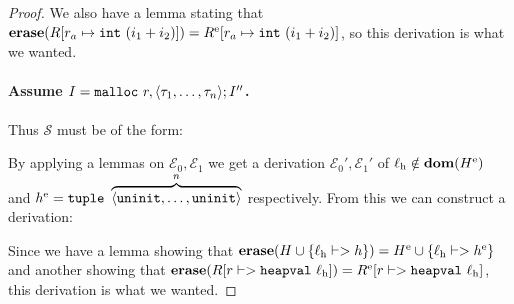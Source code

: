 \begin{proof}
  We also have a lemma stating that
  $\erase(\high R[r_a \mapsto \mathtt{int}\ (i_1 + i_2)]) = \high R^{\mathrm{e}}[r_a
  \mapsto \mathtt{int}\ (i_1 + i_2)]$, so this derivation is what we wanted.

  \paragraph{Assume $\high I = \mathtt{malloc}\ r, \langle \tau_1, \dots, \tau_n \rangle ; \high I''$.}

  Thus $\mathcal{S}$ must be of the form:

  \begin{mathpar}
  \end{mathpar}

  By applying a lemmas on $\mathcal{E}_0, \mathcal{E}_1$ we get a derivation
  $\mathcal{E}_0', \mathcal{E}_1'$ of
  $\ell_{\mathrm{h}} \notin \mathbf{dom}(\high H^{\mathrm{e}})$ and
  $\high h^{\mathrm{e}} = \mathtt{tuple}\ \overbrace{\langle \mathtt{uninit}, \dots,
    \mathtt{uninit} \rangle}^n$ respectively. From this we can construct a derivation:

  \begin{mathpar}
  \end{mathpar}

  Since we have a lemma showing that
  $\erase(\high H \cup \{\ell_{\mathrm{h}} |-> \high h\}) = \high H^{\mathrm{e}}
  \cup \{\ell_{\mathrm{h}} |-> \high h^{\mathrm{e}}\}$ and another showing that
  $\erase(\high R[r |-> \mathtt{heapval}\ \ell_{\mathrm{h}}]) = \high
  R^{\mathrm{e}}[r |-> \mathtt{heapval}\ \ell_{\mathrm{h}}]$, this derivation is
  what we wanted.
\end{proof}

